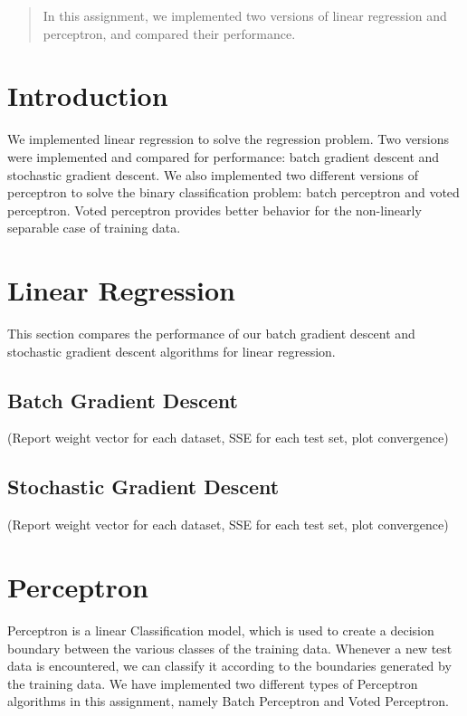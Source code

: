\documentclass[12pt]{article}
\begin{document}
\maketitle

\begin{abstract}
In this assignment, we implemented two versions of linear regression and perceptron, and compared their performance.
\end{abstract}

\section{Introduction}
We implemented linear regression to solve the regression problem. Two versions were implemented and compared for performance: batch gradient descent and stochastic gradient descent. We also implemented two different versions of perceptron to solve the binary classification problem: batch perceptron and voted perceptron. Voted perceptron provides better behavior for the non-linearly separable case of training data.

\section{Linear Regression}
This section compares the performance of our batch gradient descent and stochastic gradient descent algorithms for linear regression.

\subsection{Batch Gradient Descent}
(Report weight vector for each dataset, SSE for each test set, plot convergence)

\subsection{Stochastic Gradient Descent}
(Report weight vector for each dataset, SSE for each test set, plot convergence)

\section{Perceptron}

Perceptron is a linear Classification model, which is used to create a decision boundary between the various classes of the training data. Whenever a new test data is encountered, we can classify it according to the boundaries generated by the training data. We have implemented two different types of Perceptron algorithms in this assignment, namely Batch Perceptron and Voted Perceptron.
\end{document}
